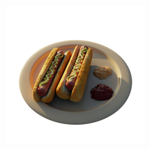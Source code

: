 \documentclass{article}
\begin{document}
\begin{figure}[!h]
\begin{subfigure}{.24\textwidth}
\end{subfigure}
\begin{subfigure}{.24\textwidth}
  \centering
  \includegraphics[width=\linewidth]{figs/results/hotdog_ref.png}  
\end{subfigure}



\end{figure}
\end{document}
